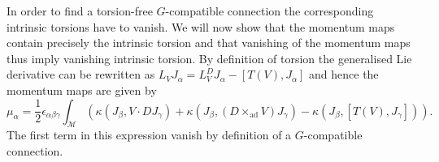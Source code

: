 In order to find a torsion-free $G$-compatible connection the corresponding intrinsic torsions have to vanish. We will now show that the momentum maps contain precisely the intrinsic torsion and that vanishing of the momentum maps thus imply vanishing intrinsic torsion. By definition of torsion the generalised Lie derivative can be rewritten as $L_V J_\alpha = L_V^DJ_\alpha-[T(V),J_\alpha]$ and hence the momentum maps are given by 
\begin{equation}
    \mu_\alpha = \frac{1}{2}\epsilon_{\alpha\beta\gamma}\int_\mathcal{M}\left(\kappa(J_\beta,V\cdot DJ_\gamma)+\kappa(J_\beta,(D\times_{\text{ad}} V)J_\gamma)-\kappa(J_\beta,[T(V),J_\gamma])\right).
\end{equation}
The first term in this expression vanish by definition of a $G$-compatible connection.  

